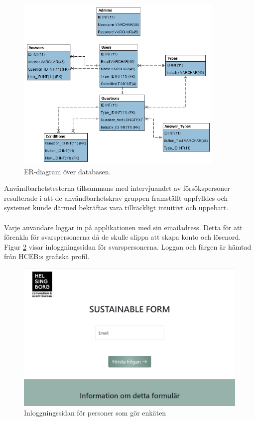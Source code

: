\documentclass[12pt]{article}
\begin{document}
\begin{figure}
    \centering
    \includegraphics[width=10cm]{ER-diagram.png}
    \caption{ER-diagram över databasen.}
    \label{fig:ER}
\end{figure}

Användbarhetstesterna tillsammans med intervjuandet av försökspersoner resulterade i att de användbarhetskrav gruppen framställt uppfylldes och systemet kunde därmed bekräftas vara tillräckligt intuitivt och uppebart.\\\\
Varje användare loggar in på applikationen med sin emailadress. Detta för att förenkla för svarspersonerna då de skulle slippa att skapa konto och lösenord. Figur \ref{fig:login} visar inloggningssidan för svarspersonerna. Loggan och färgen är hämtad från HCEB:s grafiska profil. \\

\begin{figure}[H]
    \centering
    \includegraphics[width=12cm]{images/log_in_page.png}
    \caption{Inloggningssidan för personer som gör enkäten}
    \label{fig:login}
\end{figure}
\end{document}
